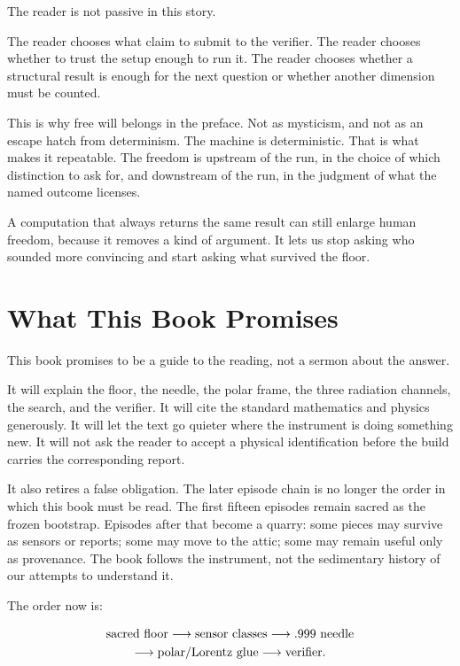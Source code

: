 The reader is not passive in this story.

The reader chooses what claim to submit to the verifier. The reader
chooses whether to trust the setup enough to run it. The reader chooses
whether a structural result is enough for the next question or whether
another dimension must be counted.

This is why free will belongs in the preface. Not as mysticism, and not
as an escape hatch from determinism. The machine is deterministic. That
is what makes it repeatable. The freedom is upstream of the run, in the
choice of which distinction to ask for, and downstream of the run, in
the judgment of what the named outcome licenses.

A computation that always returns the same result can still enlarge
human freedom, because it removes a kind of argument. It lets us stop
asking who sounded more convincing and start asking what survived the
floor.

\section*{What This Book Promises}

This book promises to be a guide to the reading, not a sermon about the
answer.

It will explain the floor, the needle, the polar frame, the three
radiation channels, the search, and the verifier. It will cite the
standard mathematics and physics generously. It will let the text go
quieter where the instrument is doing something new. It will not ask the
reader to accept a physical identification before the build carries the
corresponding report.

It also retires a false obligation. The later episode chain is no longer
the order in which this book must be read. The first fifteen episodes
remain sacred as the frozen bootstrap. Episodes after that become a
quarry: some pieces may survive as sensors or reports; some may move to
the attic; some may remain useful only as provenance. The book follows
the instrument, not the sedimentary history of our attempts to
understand it.

The order now is:

\[
\begin{array}{c}
\hbox{sacred floor}
  \longrightarrow \hbox{sensor classes}
  \longrightarrow .999\hbox{ needle}\\[3pt]
  \longrightarrow \hbox{polar/Lorentz glue}
  \longrightarrow \hbox{verifier}.
\end{array}
\]

